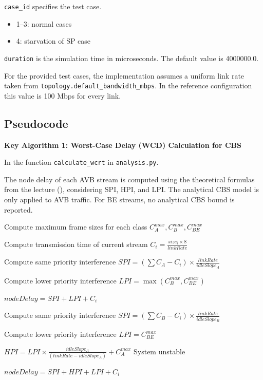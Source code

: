 \texttt{case\_id} specifies the test case.
\begin{itemize}
\item 1--3: normal cases
\item 4: starvation of SP case
\end{itemize}

\texttt{duration} is the simulation time in microseconds. The default value is 4000000.0.

For the provided test cases, the implementation assumes a uniform link rate taken from \texttt{topology.default\_bandwidth\_mbps}. In the reference configuration this value is 100 Mbps for every link.

\subsection{Pseudocode}

\textbf{Key Algorithm 1: Worst-Case Delay (WCD) Calculation for CBS}

In the function \texttt{calculate\_wcrt} in \texttt{analysis.py}.

The node delay of each AVB stream is computed using the theoretical formulas from the lecture (\cite{lecture_notes}), considering SPI, HPI, and LPI. The analytical CBS model is only applied to AVB traffic. For BE streams, no analytical CBS bound is reported.

\begin{algorithm}[H]
\caption{Node Delay Calculation for CBS}
\begin{algorithmic}[1]

\State Compute maximum frame sizes for each class
\State $C_A^{max}, C_B^{max}, C_{BE}^{max}$

\State Compute transmission time of current stream
\State $C_i = \frac{size_i \times 8}{linkRate}$

\State Compute same priority interference
\State $SPI = (\sum C_A - C_i) \times \frac{linkRate}{idleSlope_A}$

\State Compute lower priority interference
\State $LPI = \max(C_B^{max}, C_{BE}^{max})$

\State $nodeDelay = SPI + LPI + C_i$

\State Compute same priority interference
\State $SPI = (\sum C_B - C_i) \times \frac{linkRate}{idleSlope_B}$

\State Compute lower priority interference
\State $LPI = C_{BE}^{max}$

\State $HPI = LPI \times \frac{idleSlope_A}{(linkRate - idleSlope_A)} + C_A^{max}$
\Else
\State System unstable
\EndIf

\State $nodeDelay = SPI + HPI + LPI + C_i$
\EndIf

\end{algorithmic}
\end{algorithm}


